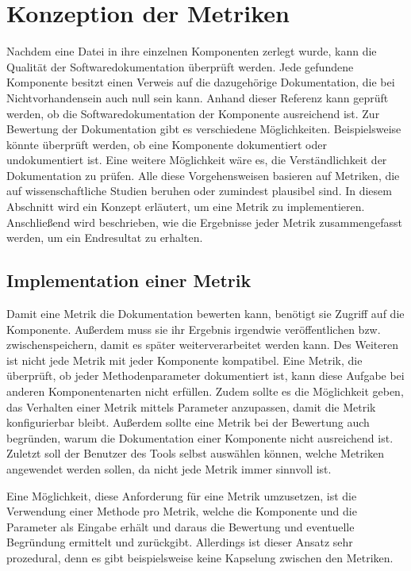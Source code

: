 \section{Konzeption der Metriken}\label{chapter:metric_conception}
Nachdem eine Datei in ihre einzelnen Komponenten zerlegt wurde, kann die Qualität der Softwaredokumentation überprüft werden. Jede gefundene Komponente besitzt einen Verweis auf die dazugehörige Dokumentation, die bei Nichtvorhandensein auch null sein kann. Anhand dieser Referenz kann geprüft werden, ob die Softwaredokumentation der Komponente ausreichend ist. Zur Bewertung der Dokumentation gibt es verschiedene  Möglichkeiten. Beispielsweise könnte überprüft werden, ob eine Komponente dokumentiert oder undokumentiert ist. Eine weitere Möglichkeit wäre es, die Verständlichkeit der Dokumentation zu prüfen. Alle diese Vorgehensweisen basieren auf Metriken, die auf wissenschaftliche Studien beruhen oder zumindest plausibel sind. In diesem Abschnitt wird ein Konzept erläutert, um eine Metrik zu implementieren. Anschließend wird beschrieben, wie die Ergebnisse jeder Metrik zusammengefasst werden, um ein Endresultat zu erhalten. 

\subsection{Implementation einer Metrik}\label{chapter:metric_impl}
Damit eine Metrik die Dokumentation bewerten kann, benötigt sie Zugriff auf die Komponente. Außerdem muss sie ihr Ergebnis irgendwie veröffentlichen bzw. zwischenspeichern, damit es später weiterverarbeitet werden kann. Des Weiteren ist nicht jede Metrik mit jeder Komponente kompatibel. Eine Metrik, die überprüft, ob jeder Methodenparameter dokumentiert ist, kann diese Aufgabe bei anderen Komponentenarten nicht erfüllen. Zudem sollte es die Möglichkeit geben, das Verhalten einer Metrik mittels Parameter anzupassen, damit die Metrik konfigurierbar bleibt. Außerdem sollte eine Metrik bei der Bewertung auch begründen, warum die Dokumentation einer Komponente nicht ausreichend ist. Zuletzt soll der Benutzer des Tools selbst auswählen können, welche Metriken angewendet werden sollen, da nicht jede Metrik immer sinnvoll ist. 

Eine Möglichkeit, diese Anforderung für eine Metrik umzusetzen, ist die Verwendung einer Methode pro Metrik, welche die Komponente und die Parameter als Eingabe erhält und daraus die Bewertung und eventuelle Begründung ermittelt und zurückgibt. Allerdings ist dieser Ansatz sehr prozedural, denn es gibt beispielsweise keine Kapselung zwischen den Metriken.  

